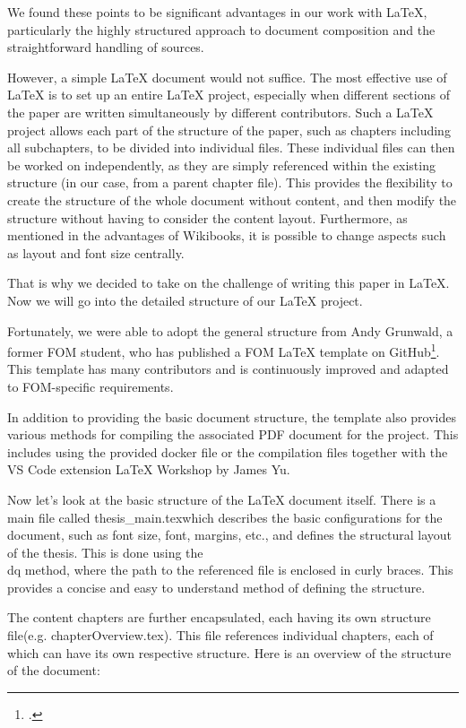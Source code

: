 We found these points to be significant advantages in our work with \LaTeX{}, particularly the highly structured approach to document composition and the straightforward handling of sources.

However, a simple \LaTeX{} document would not suffice. The most effective use of \LaTeX{} is to set up an entire \LaTeX{} project, especially when different sections of the paper are written simultaneously by different contributors. Such a \LaTeX{} project allows each part of the structure of the paper, such as chapters including all subchapters, to be divided into individual files. These individual files can then be worked on independently, as they are simply referenced within the existing structure (in our case, from a parent chapter file). This provides the flexibility to create the structure of the whole document without content, and then modify the structure without having to consider the content layout. Furthermore, as mentioned in the advantages of Wikibooks, it is possible to change aspects such as layout and font size centrally.

That is why we decided to take on the challenge of writing this paper in \LaTeX{}. Now we will go into the detailed structure of our \LaTeX{} project.

Fortunately, we were able to adopt the general structure from Andy Grunwald, a former FOM student, who has published a \dq FOM \LaTeX{} template \dq  on GitHub\footcite{grundwald_andygrunwaldfom-latex-template_nodate}. This template has many contributors and is continuously improved and adapted to FOM-specific requirements.

In addition to providing the basic document structure, the template also provides various methods for compiling the associated PDF document for the project. This includes using the provided docker file or the compilation files together with the VS Code extension \dq \LaTeX{} Workshop \dq  by James Yu.

Now let's look at the basic structure of the \LaTeX{} document itself. There is a main file called \dq thesis\_main.tex\dq  which describes the basic configurations for the document, such as font size, font, margins, etc., and defines the structural layout of the thesis. This is done using the \dq \\dq  method, where the path to the referenced file is enclosed in curly braces. This provides a concise and easy to understand method of defining the structure.

The content chapters are further encapsulated, each having its own \dq structure file\dq  (e.g. chapterOverview.tex). This file references individual chapters, each of which can have its own respective structure. Here is an overview of the structure of the document:

